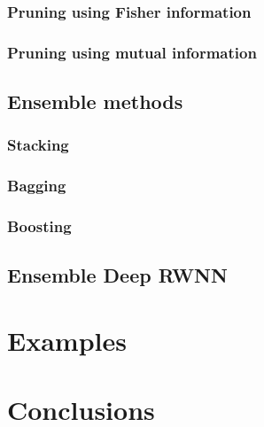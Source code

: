 \documentclass[
]{jss}
\begin{document}
\hypertarget{pruning-using-fisher-information}{%
\subsubsection{Pruning using Fisher
information}\label{pruning-using-fisher-information}}

\hypertarget{pruning-using-mutual-information}{%
\subsubsection{Pruning using mutual
information}\label{pruning-using-mutual-information}}

\hypertarget{ensemble-methods}{%
\subsection{Ensemble methods}\label{ensemble-methods}}

\hypertarget{stacking}{%
\subsubsection{Stacking}\label{stacking}}

\hypertarget{bagging}{%
\subsubsection{Bagging}\label{bagging}}

\hypertarget{boosting}{%
\subsubsection{Boosting}\label{boosting}}

\hypertarget{ensemble-deep-rwnn}{%
\subsection{Ensemble Deep RWNN}\label{ensemble-deep-rwnn}}

\hypertarget{EX}{%
\section{Examples}\label{EX}}

\hypertarget{CON}{%
\section{Conclusions}\label{CON}}

\renewcommand\refname{References}

\end{document}
